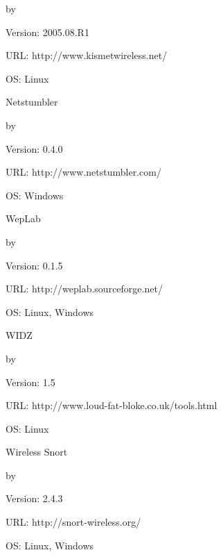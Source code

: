 \begin{appendix}
\begin{list}{}
\begin{list}{}
{			\leftmargin{} \advance\leftmargin by 
			\renewcommand{\makelabel}[1]{\mbox{#1}}
		}
		\item[Version:] 2005.08.R1
		\item[URL:] http://www.kismetwireless.net/
		\item[OS:] Linux
	\end{list}
	\item[Netstumbler] \begin{list}{}
		{
			\setlength{\parsep}{0em}
			\setlength{\labelwidth}{4em}
			\leftmargin{} \advance\leftmargin by 
			\renewcommand{\makelabel}[1]{\mbox{#1}}
		}
		\item[Version:] 0.4.0
		\item[URL:] http://www.netstumbler.com/
		\item[OS:] Windows
	\end{list}
	\item[WepLab] \begin{list}{}
		{
			\setlength{\parsep}{0em}
			\setlength{\labelwidth}{4em}
			\leftmargin{} \advance\leftmargin by 
			\renewcommand{\makelabel}[1]{\mbox{#1}}
		}
		\item[Version:] 0.1.5
		\item[URL:] http://weplab.sourceforge.net/
		\item[OS:] Linux, Windows
	\end{list}
	\item[WIDZ] \begin{list}{}
		{
			\setlength{\parsep}{0em}
			\setlength{\labelwidth}{4em}
			\leftmargin{} \advance\leftmargin by 
			\renewcommand{\makelabel}[1]{\mbox{#1}}
		}
		\item[Version:] 1.5
		\item[URL:] http://www.loud-fat-bloke.co.uk/tools.html
		\item[OS:] Linux
	\end{list}
	\item[Wireless Snort] \begin{list}{}
		{
			\setlength{\parsep}{0em}
			\setlength{\labelwidth}{4em}
			\leftmargin{} \advance\leftmargin by 
			\renewcommand{\makelabel}[1]{\mbox{#1}}
		}
		\item[Version:] 2.4.3
		\item[URL:] http://snort-wireless.org/
		\item[OS:] Linux, Windows
	\end{list}
\end{list}


\end{appendix}
